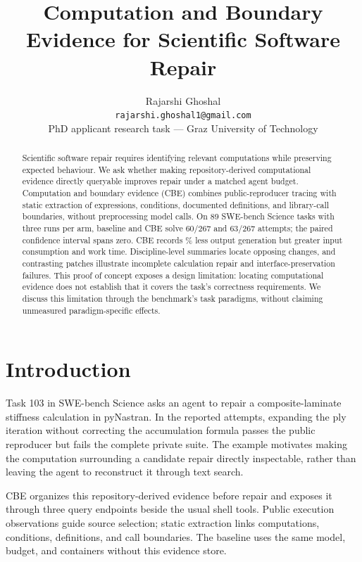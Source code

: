 \documentclass[11pt,a4paper,twocolumn]{article}
\title{Computation and Boundary Evidence for Scientific Software Repair}
\author{Rajarshi Ghoshal\\\texttt{rajarshi.ghoshal1@gmail.com}\\PhD applicant research task --- Graz University of Technology}
\date{}
\begin{document}
\raggedbottom
\maketitle

\begin{abstract}
Scientific software repair requires identifying relevant computations while preserving expected behaviour. We ask whether making repository-derived computational evidence directly queryable improves repair under a matched agent budget. Computation and boundary evidence (CBE) combines public-reproducer tracing with static extraction of expressions, conditions, documented definitions, and library-call boundaries, without preprocessing model calls. On 89 SWE-bench Science tasks with three runs per arm, baseline and CBE solve 60/267 and 63/267 attempts; the paired confidence interval spans zero. CBE records \OutputReduction\% less output generation but greater input consumption and work time. Discipline-level summaries locate opposing changes, and contrasting patches illustrate incomplete calculation repair and interface-preservation failures. This proof of concept exposes a design limitation: locating computational evidence does not establish that it covers the task's correctness requirements. We discuss this limitation through the benchmark's task paradigms, without claiming unmeasured paradigm-specific effects.
\end{abstract}

\section{Introduction}

Task 103 in SWE-bench Science asks an agent to repair a composite-laminate stiffness calculation in pyNastran. In the reported attempts, expanding the ply iteration without correcting the accumulation formula passes the public reproducer but fails the complete private suite. The example motivates making the computation surrounding a candidate repair directly inspectable, rather than leaving the agent to reconstruct it through text search.

CBE organizes this repository-derived evidence before repair and exposes it through three query endpoints beside the usual shell tools. Public execution observations guide source selection; static extraction links computations, conditions, definitions, and call boundaries. The baseline uses the same model, budget, and containers without this evidence store.
\end{document}
